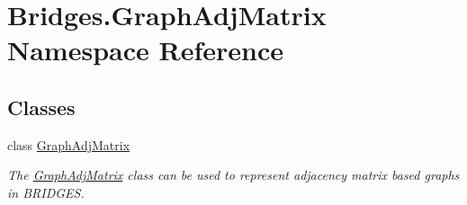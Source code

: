 \hypertarget{namespace_bridges_1_1_graph_adj_matrix}{}\section{Bridges.\+Graph\+Adj\+Matrix Namespace Reference}
\label{namespace_bridges_1_1_graph_adj_matrix}
\subsection*{Classes}
\begin{DoxyCompactItemize}
\item 
class \hyperlink{class_bridges_1_1_graph_adj_matrix_1_1_graph_adj_matrix}{Graph\+Adj\+Matrix}
\begin{DoxyCompactList}\small\item\em The \hyperlink{class_bridges_1_1_graph_adj_matrix_1_1_graph_adj_matrix}{Graph\+Adj\+Matrix} class can be used to represent adjacency matrix based graphs in B\+R\+I\+D\+G\+E\+S. \end{DoxyCompactList}\end{DoxyCompactItemize}
